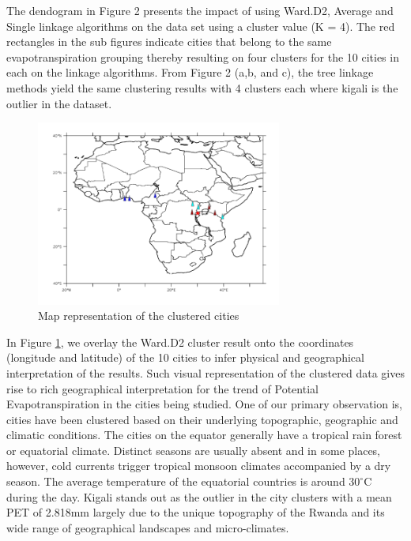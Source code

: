 \documentclass[12pt,a4paper]{article}
\begin{document}
The dendogram in Figure 2 presents the impact of using Ward.D2,  Average and Single linkage algorithms on the data set using a cluster value (K = 4). The red rectangles in the sub figures indicate cities that belong to the same evapotranspiration grouping thereby resulting on four clusters for the 10 cities in each on the linkage algorithms. From Figure 2 (a,b, and c), the tree linkage methods yield the same clustering results with 4 clusters each where kigali is the outlier in the dataset.
\begin{figure}[!h]
	  \centering
        \includegraphics[height=2.4in]{./gaphics/cluster_map.png}
        \caption{Map representation of the clustered cities}
        \label{fig:cluster_map}
\end{figure}

In Figure \ref{fig:cluster_map}, we overlay the Ward.D2 cluster result onto the coordinates (longitude and latitude) of the 10 cities to infer physical and geographical interpretation of the results.  Such visual representation of the clustered data gives rise to rich geographical interpretation for the trend of Potential Evapotranspiration in the cities being studied.
One of our primary observation is, cities have been clustered based on their underlying topographic, geographic and climatic conditions. The cities on the equator generally have a tropical rain forest or equatorial climate. Distinct seasons are usually absent and in some places, however, cold currents trigger tropical monsoon climates accompanied by a dry season. The average temperature of the equatorial countries is around $30^{\circ}$C during the day\cite{webb1960thermal}.
Kigali stands out as the outlier in the city clusters with a mean PET of 2.818mm largely due to the unique topography of the Rwanda and its wide range of geographical landscapes and micro-climates. 
\end{document}
